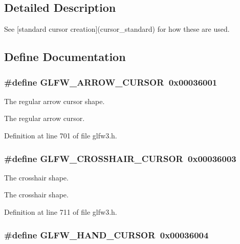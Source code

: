 \subsection{Detailed Description}
See \mbox{[}standard cursor creation\mbox{]}(cursor\_\-standard) for how these are used. 

\subsection{Define Documentation}
\hypertarget{group__shapes_g8ab0e717245b85506cb0eaefdea39d0a}{
\subsubsection[GLFW\_\-ARROW\_\-CURSOR]{\setlength{\rightskip}{0pt plus 5cm}\#define GLFW\_\-ARROW\_\-CURSOR~0x00036001}}
\label{group__shapes_g8ab0e717245b85506cb0eaefdea39d0a}


The regular arrow cursor shape. 

The regular arrow cursor. 

Definition at line 701 of file glfw3.h.\hypertarget{group__shapes_g8af88c0ea05ab9e8f9ac1530e8873c22}{
\subsubsection[GLFW\_\-CROSSHAIR\_\-CURSOR]{\setlength{\rightskip}{0pt plus 5cm}\#define GLFW\_\-CROSSHAIR\_\-CURSOR~0x00036003}}
\label{group__shapes_g8af88c0ea05ab9e8f9ac1530e8873c22}


The crosshair shape. 

The crosshair shape. 

Definition at line 711 of file glfw3.h.\hypertarget{group__shapes_g1db35e20849e0837c82e3dc1fd797263}{
\subsubsection[GLFW\_\-HAND\_\-CURSOR]{\setlength{\rightskip}{0pt plus 5cm}\#define GLFW\_\-HAND\_\-CURSOR~0x00036004}}
\label{group__shapes_g1db35e20849e0837c82e3dc1fd797263}


